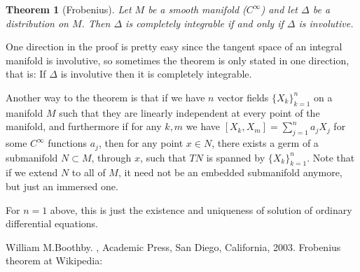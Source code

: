 \documentclass[12pt]{article}
\theoremstyle{theorem}
\newtheorem*{thm}{Theorem}
\theoremstyle{definition}
\begin{document}
\begin{thm}[Frobenius]
Let $M$ be a smooth manifold ($C^\infty$) and let $\Delta$ be a
distribution on $M$.  Then $\Delta$ is completely integrable if and only if
$\Delta$ is involutive.
\end{thm}

One direction in the proof is pretty easy since the tangent space
of an integral manifold is involutive, so sometimes the theorem is only
stated in one direction, that is:  If $\Delta$ is involutive then it is
completely integrable.

Another way to  the theorem is that if we have $n$ vector fields $\{X_k\}_{k=1}^n$ on a manifold $M$ such that they are linearly independent at every point of the manifold, and furthermore if for any $k,m$ we have
$[X_k,X_m] = \sum_{j=1}^n a_j X_j$ for some $C^\infty$ functions $a_j$, then for any point $x \in N$, there exists a germ of a submanifold $N \subset M$, through  $x$, such that $TN$ is spanned
by $\{X_k\}_{k=1}^n$.  Note that if we extend $N$ to all of $M$, it need not be
an embedded submanifold anymore, but just an immersed one.

For $n=1$ above, this is just the existence and uniqueness of solution of ordinary differential equations.

\begin{thebibliography}{9}
William M.\@ Boothby.
{\em {}},
Academic Press, San Diego, California, 2003.
 Frobenius theorem at Wikipedia: 
\end{thebibliography}
\end{document}
